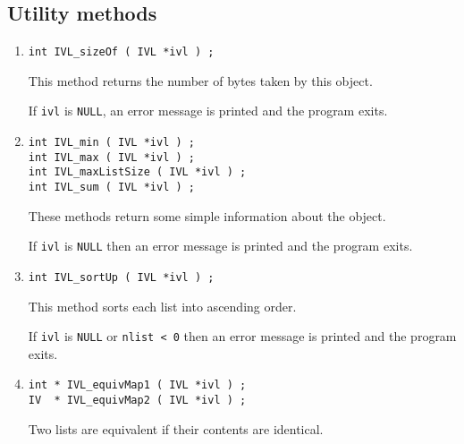 \subsection{Utility methods}
\label{subsection:IVL:proto:utilities}
\par
\begin{enumerate}
\item
\begin{verbatim}
int IVL_sizeOf ( IVL *ivl ) ;
\end{verbatim}
This method returns the number of bytes taken by this object.
\par {}
If {\tt ivl} is {\tt NULL},
an error message is printed and the program exits.
\item
\begin{verbatim}
int IVL_min ( IVL *ivl ) ;
int IVL_max ( IVL *ivl ) ;
int IVL_maxListSize ( IVL *ivl ) ;
int IVL_sum ( IVL *ivl ) ;
\end{verbatim}
These methods return some simple information about the object.
\par {}
If {\tt ivl} is {\tt NULL} then 
an error message is printed and the program exits.
\item
\begin{verbatim}
int IVL_sortUp ( IVL *ivl ) ;
\end{verbatim}
This method sorts each list into ascending order.
\par {}
If {\tt ivl} is {\tt NULL} or {\tt nlist < 0} then 
an error message is printed and the program exits.
\item
\begin{verbatim}
int * IVL_equivMap1 ( IVL *ivl ) ;
IV  * IVL_equivMap2 ( IVL *ivl ) ;
\end{verbatim}
Two lists are equivalent if their contents are identical.

\end{enumerate}
